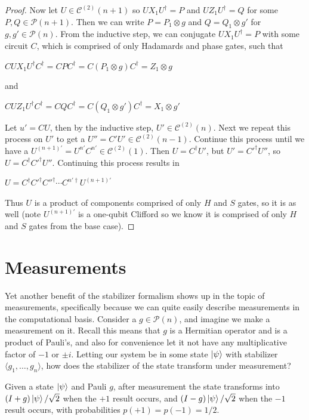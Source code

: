 \documentclass[12pt]{dalthesis}
\begin{document}
\begin{proof}
Now let $U \in \mathcal{C}^{(2)}(n+1)$ so $UX_1U^\dag = P$ and $UZ_1U^\dag = Q$ for some $P, Q \in \mathcal{P}(n+1)$. Then we can write $P = P_1 \otimes g$ and $Q = Q_1 \otimes g'$ for $g, g' \in \mathcal{P}(n)$. From the inductive step, we can conjugate $UX_1U^\dag = P$ with some circuit $C$, which is comprised of only Hadamards and phase gates, such that 
\begin{center}
$CUX_1U^\dag C^\dag = CPC^\dag = C(P_1 \otimes g)C^\dag = Z_1 \otimes g$
\end{center}
and 
\begin{center}
$CUZ_1U^\dag C^\dag = CQC^\dag = C(Q_1 \otimes g')C^\dag = X_1 \otimes g'$
\end{center}
Let $u' = CU$, then by the inductive step, $U' \in \mathcal{C}^{(2)}(n)$. Next we repeat this process on $U'$ to get a $U'' = C'U' \in \mathcal{C}^{(2)}(n-1)$. Continue this process until we have a $U^{(n+1)'} = U^{n'}C^{n'} \in \mathcal{C}^{(2)}(1)$. Then $U = C^\dag U'$, but $U' = C'^\dag U''$, so $U = C^\dag C'^\dag U''$. Continuing this process results in 
\begin{center}
$U = C^\dag C'^\dag C''^\dag \cdots C^{n' \dag} U^{(n+1)'}$
\end{center}
Thus $U$ is a product of components comprised of only $H$ and $S$ gates, so it is as well (note $U^{(n+1)'}$ is a one-qubit Clifford so we know it is comprised of only $H$ and $S$ gates from the base case).
\end{proof}

\section{Measurements}
Yet another benefit of the stabilizer formalism shows up in the topic of measurements, specifically because we can quite easily describe measurements in the computational basis. Consider a $g \in \mathcal{P}(n)$, and imagine we make a measurement on it. Recall this means that $g$ is a Hermitian operator and is a product of Pauli's, and also for convenience let it not have any multiplicative factor of $-1$ or $\pm i$. Letting our system be in some state $\ket{\psi}$ with stabilizer $\langle g_1, \dots , g_n \rangle $, how does the stabilizer of the state transform under measurement? 

\begin{proposition}
Given a state $\ket{\psi}$ and Pauli $g$, after measurement the state transforms into $(I + g)\ket{\psi}/\sqrt{2}$ when the $+1$ result occurs, and $(I - g)\ket{\psi}/\sqrt{2}$ when the $-1$ result occurs, with probabilities $p(+1) = p(-1) = 1/2$.
\end{proposition}
\end{document}

